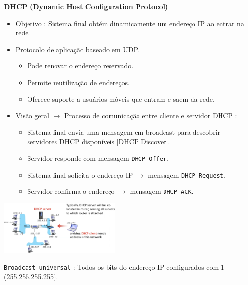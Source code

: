             \textbf{DHCP (Dynamic Host Configuration Protocol)}
            \begin{itemize}[left=0.5cm, align=left, nosep]
                \item Objetivo : Sistema final obtém dinamicamente um endereço IP ao entrar na rede.
                \item Protocolo de aplicação baseado em UDP.
                    \begin{itemize}[left=0.5cm, nosep, label=$\hookrightarrow$]
                        \item Pode renovar o endereço reservado.
                        \item Permite reutilização de endereços.
                        \item Oferece suporte a usuários móveis que entram e saem da rede.
                    \end{itemize} 
                \item Visão geral $\rightarrow$ Processo de comunicação entre cliente e servidor DHCP :
                    \begin{itemize}[left=0.5cm, nosep, label=$\hookrightarrow$]
                        \item Sistema final envia uma mensagem em broadcast para descobrir servidores DHCP disponíveis [DHCP Discover].
                        \item Servidor responde com mensagem \texttt{DHCP Offer}.
                        \item Sistema final solicita o endereço IP $\rightarrow$ mensagem \texttt{DHCP Request}.
                        \item Servidor confirma o endereço $\rightarrow$ mensagem \texttt{DHCP ACK}.
                    \end{itemize}
            \end{itemize}

            \begin{center}
                \includegraphics[width=0.45\textwidth]{img/cap-04/dhcp.png}
            \end{center}

            \texttt{Broadcast universal} : Todos os bits do endereço IP configurados com 1 (255.255.255.255).

